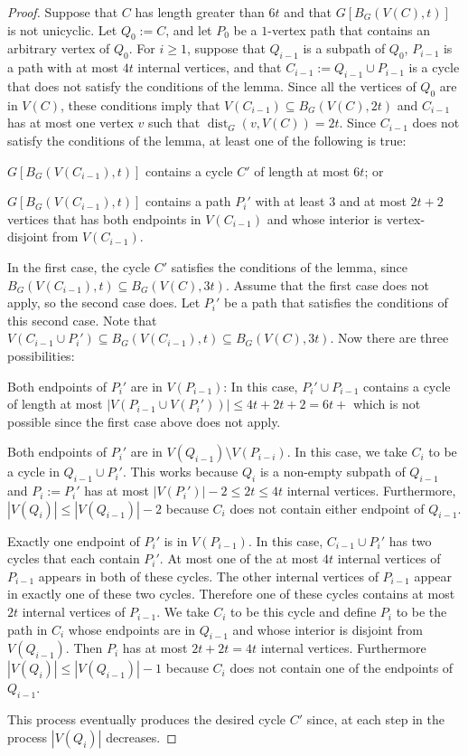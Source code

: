 \documentclass{patmorin}
\renewcommand{\ge}{\geqslant}
\renewcommand{\le}{\leqslant}
\DeclareMathOperator{\dist}{dist}
\begin{document}
\begin{proof}
  Suppose that $C$ has length greater than $6t$ and that $G[B_G(V(C),t)]$ is not unicyclic.
  Let $Q_0:=C$, and let $P_0$ be a $1$-vertex path that contains an arbitrary vertex of $Q_0$.  For $i\ge 1$, suppose that $Q_{i-1}$ is a subpath of $Q_0$, $P_{i-1}$ is a path with at most $4t$ internal vertices, and that $C_{i-1}:=Q_{i-1}\cup P_{i-1}$ is a cycle that does not satisfy the conditions of the lemma.  Since all the vertices of $Q_0$ are in $V(C)$, these conditions imply that $V(C_{i-1})\subseteq B_G(V(C),2t)$ and $C_{i-1}$ has at most one vertex $v$ such that $\dist_G(v,V(C))=2t$.  Since $C_{i-1}$ does not satisfy the conditions of the lemma, at least one of the following is true:
  \begin{compactenum}
    \item $G[B_G(V(C_{i-1}),t)]$ contains a cycle $C'$ of length at most $6t$; or
    \item $G[B_G(V(C_{i-1}),t)]$ contains a path $P_i'$ with at least $3$ and at most $2t+2$ vertices that has both endpoints in $V(C_{i-1})$ and whose interior is vertex-disjoint from $V(C_{i-1})$.
  \end{compactenum}
  In the first case, the cycle $C'$ satisfies the conditions of the lemma, since $B_G(V(C_{i-1}),t)\subseteq B_G(V(C),3t)$.  Assume that the first case does not apply, so the second case does.  Let $P_i'$ be a path that satisfies the conditions of this second case.  Note that $V(C_{i-1}\cup P_i')\subseteq B_G(V(C_{i-1}),t)\subseteq B_G(V(C),3t)$.   Now there are three possibilities:
  \begin{compactenum}
    \item Both endpoints of $P_i'$ are in $V(P_{i-1})$: In this case, $P_i'\cup P_{i-1}$ contains a cycle of length at most $|V(P_{i-1}\cup V(P_i'))|\le 4t+2t+2=6t+$ which is not possible since the first case above does not apply.
    \item Both endpoints of $P_i'$ are in $V(Q_{i-1})\setminus V(P_{i-i})$.    In this case, we take $C_i$ to be a cycle in $Q_{i-1}\cup P_i'$. This works because $Q_i$ is a non-empty subpath of $Q_{i-1}$ and $P_i:=P_i'$ has at most $|V(P_i')|-2\le 2t\le 4t$ internal vertices.  Furthermore, $|V(Q_i)|\le |V(Q_{i-1})|-2$ because $C_i$ does not contain either endpoint of $Q_{i-1}$.
    \item Exactly one endpoint of $P_i'$ is in $V(P_{i-1})$.  In this case, $C_{i-1}\cup P_i'$ has two cycles that each contain $P_i'$.  At most one of the at most $4t$ internal vertices of $P_{i-1}$ appears in both of these cycles. The other internal vertices of $P_{i-1}$ appear in exactly one of these two cycles.  Therefore one of these cycles contains at most $2t$ internal vertices of $P_{i-1}$.  We take $C_i$ to be this cycle and define $P_i$ to be the path in $C_i$ whose endpoints are in $Q_{i-1}$ and whose interior is disjoint from $V(Q_{i-1})$.  Then $P_i$ has at most $2t+2t= 4t$ internal vertices.  Furthermore $|V(Q_i)|\le |V(Q_{i-1})|-1$ because $C_i$ does not contain one of the endpoints of $Q_{i-1}$.
  \end{compactenum}
  This process eventually produces the desired cycle $C'$ since, at each step in the process $|V(Q_i)|$ decreases.
\end{proof}
\end{document}
